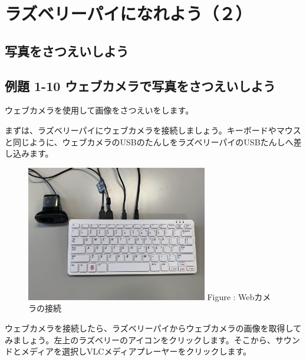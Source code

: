 \documentclass[a4paper,12pt]{jarticle}
\begin{document}
\section[ラズベリーパイになれよう（２）]{ラズベリーパイになれよう（２）}
\subsection{写真をさつえいしよう}
\subsection{例題 1-10
  ウェブカメラで写真をさつえいしよう}
ウェブカメラを使用して画像をさつえいをします。

まずは、ラズベリーパイにウェブカメラを接続しましょう。キーボードやマウスと同じように、ウェブカメラのUSBのたんしをラズベリーパイのUSBたんしへ差し込みます。



\begin{figure}[ht]
  \centering
  \begin{minipage}{8.528cm}
    {\upshape
      \includegraphics[width=7.904cm,height=5.928cm]{textbook-img112-2023.jpg}
      \newline
      Figure : Webカメラの接続}
  \end{minipage}
\end{figure}
ウェブカメラを接続したら、ラズベリーパイからウェブカメラの画像を取得してみましょう。左上のラズベリーのアイコンをクリックします。そこから、サウンドとメディアを選択しVLCメディアプレーヤーをクリックします。
\end{document}
